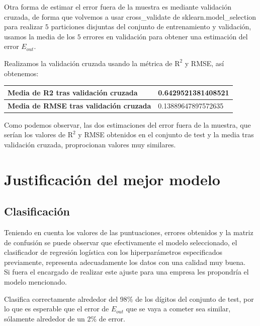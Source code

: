 \documentclass[12pt]{article}
\begin{document}
Otra forma de estimar el error fuera de la muestra es mediante validación cruzada, de forma que volvemos a usar cross\_validate de sklearn.model\_selection para realizar $5$ particiones disjuntas del conjunto de entrenamiento y validación, usamos la media de los $5$ errores en validación para obtener una estimación del error $E_{out}$. 

Realizamos la validación cruzada usando la métrica de $\text{R}^2$ y RMSE, así obtenemos:

\begin{table}[H]
\centering
\begin{tabular}{|l|l|}
\hline
\textbf{Media de R2 tras validación cruzada}   & 0.6429521381408521  \\ \hline
\textbf{Media de RMSE tras validación cruzada} & 0.13889647897572635 \\ \hline
\end{tabular}
\end{table}

Como podemos observar, las dos estimaciones del error fuera de la muestra, que serían los valores de $\text{R}^2$ y RMSE obtenidos en el conjunto de test y la media tras validación cruzada, proprocionan valores muy similares. 

\clearpage

\section{Justificación del mejor modelo}

\subsection{Clasificación}

Teniendo en cuenta los valores de las puntuaciones, errores obtenidos y la matriz de confusión se puede observar que efectivamente el modelo seleccionado, el clasificador de regresión logística con los hiperparámetros especificados previamente, representa adecuadamente los datos con una calidad muy buena. \\

Si fuera el encargado de realizar este ajuste para una empresa les propondría el modelo mencionado.

Clasifica correctamente alrededor del 98\% de los dígitos del conjunto de test, por lo que es esperable que el error de $E_{out}$ que se vaya a cometer sea similar, sólamente alrededor de un 2\% de error. \\
\end{document}
